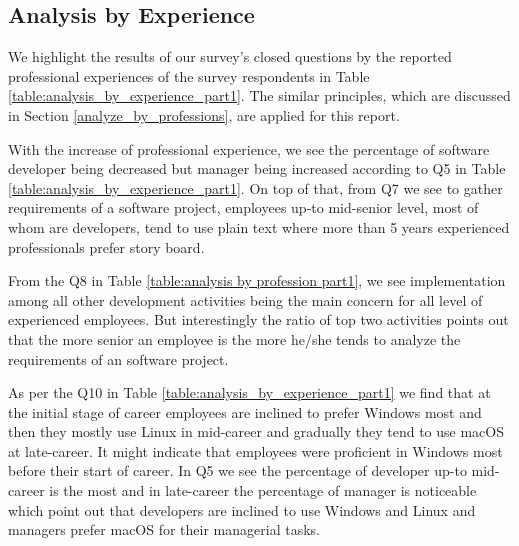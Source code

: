 \subsection{Analysis by Experience}

We highlight the results of our survey's closed questions by the reported professional experiences of the survey respondents in Table \ref{table:analysis_by_experience_part1}. The similar principles, which are discussed in Section \ref{analyze_by_professions}, are applied for this report.




With the increase of professional experience, we see the percentage of software developer being decreased but manager being increased according to Q5 in Table \ref{table:analysis_by_experience_part1}. On top of that, from Q7 we see to gather requirements of a software project, employees up-to mid-senior level, most of whom are developers, tend to use plain text where more than 5 years experienced professionals prefer story board.

From the Q8 in Table \ref{table:analysis by profession part1}, we see implementation among all other development activities being the main concern for all level of experienced employees. But interestingly the ratio of top two activities points out that the more senior an employee is the more he/she tends to analyze the requirements of an software project.

As per the Q10 in Table \ref{table:analysis_by_experience_part1} we find that at the initial stage of career employees are inclined to prefer Windows most and then they mostly use Linux in mid-career and gradually they tend to use macOS at late-career. It might indicate that employees were proficient in Windows most before their start of career. In Q5 we see the percentage of developer up-to mid-career is the most and in late-career the percentage of manager is noticeable which point out that developers are inclined to use Windows and Linux and managers prefer macOS for their managerial tasks.

